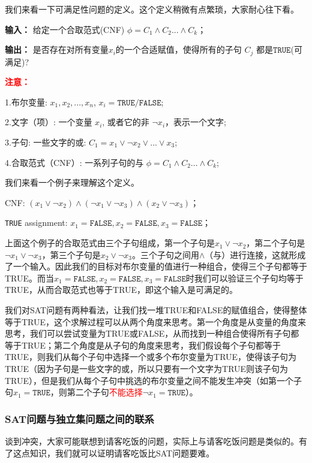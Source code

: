 我们来看一下可满足性问题的定义。这个定义稍微有点繁琐，大家耐心往下看。

{\bf 输入：} 给定一个合取范式(CNF) $\phi = C_1 \wedge C_2 ... \wedge C_k$；

{\bf 输出：} 是否存在对所有变量$x_i$的一个合适赋值，使得所有的子句 $C_j$ 都是$\texttt{TRUE}$(可满足)? 

\textbf{\textcolor{red}{注意：}}

1.布尔变量: $x_1, x_2, ..., x_n$, $x_i = \texttt{TRUE/FALSE} $;

2.文字（项）: 一个变量 $x_i$, 或者它的非 $\neg x_i$，表示一个文字;

3.子句: 一些文字的或: $C_1 = x_1 \vee \neg x_2 \vee ... \vee x_3 $;

4.合取范式（CNF）: 一系列子句的与 $\phi = C_1 \wedge C_2 ... \wedge C_k$;

我们来看一个例子来理解这个定义。

CNF:  $(x_1 \vee \neg x_2) \wedge ( \neg x_1 \vee \neg x_3 ) \wedge ( x_2 \vee \neg x_3 )$；

\texttt{TRUE} assignment:  $x_1 = \texttt{FALSE}, x_2= \texttt{FALSE}, x_3 = \texttt{FALSE} $；

上面这个例子的合取范式由三个子句组成，第一个子句是$x_1 \vee \neg x_2$，第二个子句是$\neg x_1 \vee \neg x_3$，第三个子句是$x_2 \vee \neg x_3$。三个子句之间用$\wedge $（与）进行连接，这就形成了一个输入。因此我们的目标对布尔变量的值进行一种组合，使得三个子句都等于TRUE。而当$x_1 = \texttt{FALSE}, x_2= \texttt{FALSE}, x_3 = \texttt{FALSE} $时我们可以验证三个子句均等于TRUE，从而合取范式也等于TRUE，即这个输入是可满足的。


我们对SAT问题有两种看法，让我们找一堆TRUE和FALSE的赋值组合，使得整体等于TRUE，这个求解过程可以从两个角度来思考。第一个角度是从变量的角度来思考，我们可以尝试变量为TRUE或FALSE，从而找到一种组合使得所有子句都等于TRUE；第二个角度是从子句的角度来思考，我们假设每个子句都等于TRUE，则我们从每个子句中选择一个或多个布尔变量为TRUE，使得该子句为TRUE（因为子句是一些文字的或，所以只要有一个文字为TRUE则该子句为TRUE），但是我们从每个子句中挑选的布尔变量之间不能发生冲突（如第一个子句$x_1=\texttt{TRUE}$，则第二个子句\textcolor{red}{不能选择}$\neg x_1 = \texttt{TRUE}$）。

\subsubsection{SAT问题与独立集问题之间的联系}

谈到冲突，大家可能联想到请客吃饭的问题，实际上与请客吃饭问题是类似的。有了这点知识，我们就可以证明请客吃饭比SAT问题要难。

